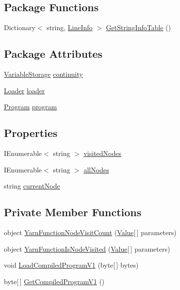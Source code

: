 \subsection*{Package Functions}
\begin{DoxyCompactItemize}
\item 
Dictionary$<$ string, \hyperlink{a00105}{Line\-Info} $>$ \hyperlink{a00072_a5c5117de678626ebcfb9a6f875e6e53a}{Get\-String\-Info\-Table} ()
\end{DoxyCompactItemize}
\subsection*{Package Attributes}
\begin{DoxyCompactItemize}
\item 
\hyperlink{a00166}{Variable\-Storage} \hyperlink{a00072_ae94eaa4b03b432422f5d205fabe37ff5}{continuity}
\item 
\hyperlink{a00107}{Loader} \hyperlink{a00072_a98bbe0ac2ccadeeeb7e05e3e6e19f2e0}{loader}
\item 
\hyperlink{a00126}{Program} \hyperlink{a00072_a0a1cca92325f430425d784d416cb5c2b}{program}
\end{DoxyCompactItemize}
\subsection*{Properties}
\begin{DoxyCompactItemize}
\item 
I\-Enumerable$<$ string $>$ \hyperlink{a00072_ac5661051e0b7f44527fe526c7766dbbf}{visited\-Nodes}
\item 
I\-Enumerable$<$ string $>$ \hyperlink{a00072_a0ee573e3d072bccf98ba1d975612d42c}{all\-Nodes}
\item 
string \hyperlink{a00072_af368b5c342d585dc6953876c5965ccc8}{current\-Node}
\end{DoxyCompactItemize}
\subsection*{Private Member Functions}
\begin{DoxyCompactItemize}
\item 
object \hyperlink{a00072_a10c9f22d3f55e74f091cd6069c431094}{Yarn\-Function\-Node\-Visit\-Count} (\hyperlink{a00163}{Value}\mbox{[}$\,$\mbox{]} parameters)
\item 
object \hyperlink{a00072_a1ab129bd84381928531d503304ca08d6}{Yarn\-Function\-Is\-Node\-Visited} (\hyperlink{a00163}{Value}\mbox{[}$\,$\mbox{]} parameters)
\item 
void \hyperlink{a00072_a706df08e842c2419f7a66fd40c0a544f}{Load\-Compiled\-Program\-V1} (byte\mbox{[}$\,$\mbox{]} bytes)
\item 
byte\mbox{[}$\,$\mbox{]} \hyperlink{a00072_a070898dbc07fd7d0a74d7c3ac1848beb}{Get\-Compiled\-Program\-V1} ()
\end{DoxyCompactItemize}
